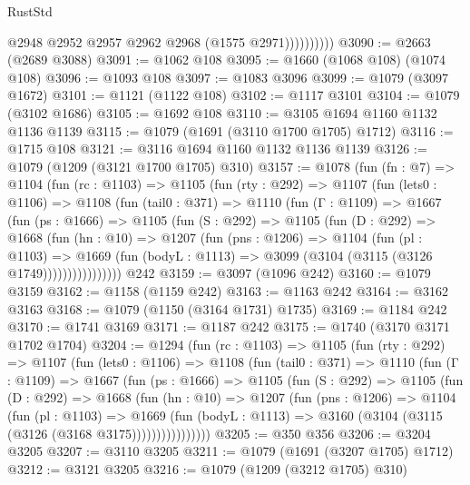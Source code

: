 \begin{lexlean}{RustStd}
\begin{coremodule}
{\begin{coremodule}
{{{{{{{{{{                      @2948
                      @2952
                      @2957
                      @2962
                      @2968
                      (@1575 @2971))))))))))
@3090 := @2663 (@2689 @3088)
@3091 := @1062 @108
@3095 := @1660 (@1068 @108) (@1074 @108)
@3096 := @1093 @108
@3097 := @1083 @3096
@3099 := @1079 (@3097 @1672)
@3101 := @1121 (@1122 @108)
@3102 := @1117 @3101
@3104 := @1079 (@3102 @1686)
@3105 := @1692 @108
@3110 := @3105 @1694 @1160 @1132 @1136 @1139
@3115 := @1079 (@1691 (@3110 @1700 @1705) @1712)
@3116 := @1715 @108
@3121 := @3116 @1694 @1160 @1132 @1136 @1139
@3126 := @1079 (@1209 (@3121 @1700 @1705) @310)
@3157 := @1078
    (fun (fn : @7) =>
    @1104
      (fun (rc : @1103) =>
      @1105
        (fun (rty : @292) =>
        @1107
          (fun (lets0 : @1106) =>
          @1108
            (fun (tail0 : @371) =>
            @1110
              (fun (Γ : @1109) =>
              @1667
                (fun (ps : @1666) =>
                @1105
                  (fun (S : @292) =>
                  @1105
                    (fun (D : @292) =>
                    @1668
                      (fun (hn : @10) =>
                      @1207
                        (fun (pns : @1206) =>
                        @1104
                          (fun (pl : @1103) =>
                          @1669
                            (fun (bodyL : @1113) => @3099 (@3104 (@3115 (@3126 @1749))))))))))))))))
    @242
@3159 := @3097 (@1096 @242)
@3160 := @1079 @3159
@3162 := @1158 (@1159 @242)
@3163 := @1163 @242
@3164 := @3162 @3163
@3168 := @1079 (@1150 (@3164 @1731) @1735)
@3169 := @1184 @242
@3170 := @1741 @3169
@3171 := @1187 @242
@3175 := @1740 (@3170 @3171 @1702 @1704)
@3204 := @1294
    (fun (rc : @1103) =>
    @1105
      (fun (rty : @292) =>
      @1107
        (fun (lets0 : @1106) =>
        @1108
          (fun (tail0 : @371) =>
          @1110
            (fun (Γ : @1109) =>
            @1667
              (fun (ps : @1666) =>
              @1105
                (fun (S : @292) =>
                @1105
                  (fun (D : @292) =>
                  @1668
                    (fun (hn : @10) =>
                    @1207
                      (fun (pns : @1206) =>
                      @1104
                        (fun (pl : @1103) =>
                        @1669
                          (fun (bodyL : @1113) =>
                          @3160 (@3104 (@3115 (@3126 (@3168 @3175))))))))))))))))
@3205 := @350 @356
@3206 := @3204 @3205
@3207 := @3110 @3205
@3211 := @1079 (@1691 (@3207 @1705) @1712)
@3212 := @3121 @3205
@3216 := @1079 (@1209 (@3212 @1705) @310)
}}}}}}}}}}
\end{coremodule}}
\end{coremodule}
\end{lexlean}
